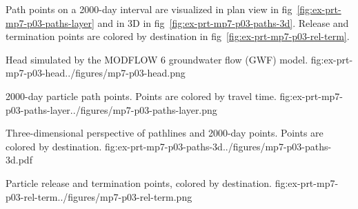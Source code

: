 Path points on a 2000-day interval are visualized in plan view in fig~\ref{fig:ex-prt-mp7-p03-paths-layer} and in 3D in fig~\ref{fig:ex-prt-mp7-p03-paths-3d}. Release and termination points are colored by destination in fig~\ref{fig:ex-prt-mp7-p03-rel-term}.

\begin{StandardFigure}{
    Head simulated by the MODFLOW 6 groundwater flow (GWF) model.
    }{fig:ex-prt-mp7-p03-head}{../figures/mp7-p03-head.png}
\end{StandardFigure}

\begin{StandardFigure}{
    2000-day particle path points. Points are colored by travel time.
    }{fig:ex-prt-mp7-p03-paths-layer}{../figures/mp7-p03-paths-layer.png}
\end{StandardFigure}

\begin{StandardFigure}{
    Three-dimensional perspective of pathlines and 2000-day points. Points are colored by destination.
    }{fig:ex-prt-mp7-p03-paths-3d}{../figures/mp7-p03-paths-3d.pdf}
\end{StandardFigure}

\begin{StandardFigure}{
    Particle release and termination points, colored by destination.
    }{fig:ex-prt-mp7-p03-rel-term}{../figures/mp7-p03-rel-term.png}
\end{StandardFigure}